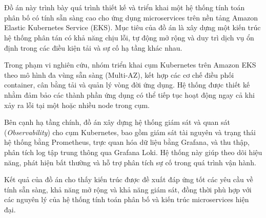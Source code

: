 \chapter*{}

Đồ án này trình bày quá trình thiết kế và triển khai một hệ thống tính toán phân bố
có tính sẵn sàng cao cho ứng dụng microservices trên nền tảng Amazon Elastic Kubernetes Service (EKS).
Mục tiêu của đồ án là xây dựng một kiến trúc hệ thống phân tán có khả năng chịu lỗi,
tự động mở rộng và duy trì dịch vụ ổn định trong các điều kiện tải và sự cố hạ tầng khác nhau.

Trong phạm vi nghiên cứu, nhóm triển khai cụm Kubernetes trên Amazon EKS
theo mô hình đa vùng sẵn sàng (Multi-AZ),
kết hợp các cơ chế điều phối container, cân bằng tải và quản lý vòng đời ứng dụng.
Hệ thống được thiết kế nhằm đảm bảo các thành phần ứng dụng có thể tiếp tục hoạt động
ngay cả khi xảy ra lỗi tại một hoặc nhiều node trong cụm.

Bên cạnh hạ tầng chính, đồ án xây dựng hệ thống giám sát và quan sát
(\textit{Observability}) cho cụm Kubernetes,
bao gồm giám sát tài nguyên và trạng thái hệ thống bằng Prometheus,
trực quan hóa dữ liệu bằng Grafana,
và thu thập, phân tích log tập trung thông qua Grafana Loki.
Hệ thống này giúp theo dõi hiệu năng, phát hiện bất thường
và hỗ trợ phân tích sự cố trong quá trình vận hành.

Kết quả của đồ án cho thấy kiến trúc được đề xuất đáp ứng tốt các yêu cầu
về tính sẵn sàng, khả năng mở rộng và khả năng giám sát,
đồng thời phù hợp với các nguyên lý của hệ thống tính toán phân bố
và kiến trúc microservices hiện đại.
